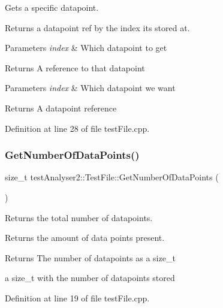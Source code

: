 Gets a specific datapoint. 

Returns a datapoint ref by the index it\textquotesingle{}s stored at.


\begin{DoxyParams}{Parameters}
{\em index} & Which datapoint to get \\
\hline
\end{DoxyParams}
\begin{DoxyReturn}{Returns}
A reference to that datapoint
\end{DoxyReturn}

\begin{DoxyParams}{Parameters}
{\em index} & Which datapoint we want \\
\hline
\end{DoxyParams}
\begin{DoxyReturn}{Returns}
A datapoint reference 
\end{DoxyReturn}


Definition at line 28 of file test\+File.\+cpp.

\mbox{\label{classtestAnalyser2_1_1TestFile_ae626148fab71cd482ab642d555421495}} 
\subsubsection{\texorpdfstring{GetNumberOfDataPoints()}{GetNumberOfDataPoints()}}
{\footnotesize\ttfamily size\+\_\+t test\+Analyser2\+::\+Test\+File\+::\+Get\+Number\+Of\+Data\+Points (\begin{DoxyParamCaption}{ }\end{DoxyParamCaption})}



Returns the total number of datapoints. 

Returns the amount of data points present.

\begin{DoxyReturn}{Returns}
The number of datapoints as a size\+\_\+t

a size\+\_\+t with the number of datapoints stored 
\end{DoxyReturn}


Definition at line 19 of file test\+File.\+cpp.

\mbox{\label{classtestAnalyser2_1_1TestFile_a1c5053e9521ad606e2c1361db7c30b70}} 
